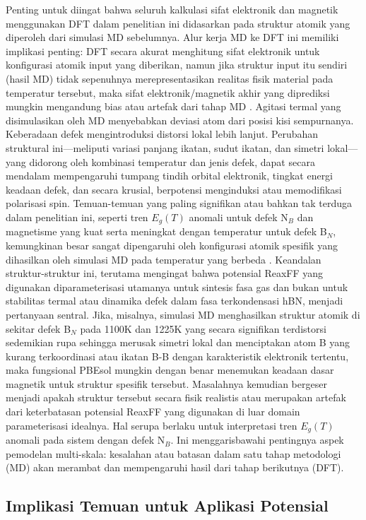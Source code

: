 Penting untuk diingat bahwa seluruh kalkulasi sifat elektronik dan magnetik menggunakan DFT dalam penelitian ini didasarkan pada struktur atomik yang diperoleh dari simulasi MD sebelumnya. Alur kerja MD ke DFT ini memiliki implikasi penting: DFT secara akurat menghitung sifat elektronik untuk konfigurasi atomik input yang diberikan, namun jika struktur input itu sendiri (hasil MD) tidak sepenuhnya merepresentasikan realitas fisik material pada temperatur tersebut, maka sifat elektronik/magnetik akhir yang diprediksi mungkin mengandung bias atau artefak dari tahap MD . Agitasi termal yang disimulasikan oleh MD menyebabkan deviasi atom dari posisi kisi sempurnanya. Keberadaan defek mengintroduksi distorsi lokal lebih lanjut. Perubahan struktural ini—meliputi variasi panjang ikatan, sudut ikatan, dan simetri lokal—yang didorong oleh kombinasi temperatur dan jenis defek, dapat secara mendalam mempengaruhi tumpang tindih orbital elektronik, tingkat energi keadaan defek, dan secara krusial, berpotensi menginduksi atau memodifikasi polarisasi spin. Temuan-temuan yang paling signifikan atau bahkan tak terduga dalam penelitian ini, seperti tren $E_g(T)$ anomali untuk defek N$_B$ dan magnetisme yang kuat serta meningkat dengan temperatur untuk defek B$_N$, kemungkinan besar sangat dipengaruhi oleh konfigurasi atomik spesifik yang dihasilkan oleh simulasi MD pada temperatur yang berbeda . Keandalan struktur-struktur ini, terutama mengingat bahwa potensial ReaxFF yang digunakan \citep{Lele2022} diparameterisasi utamanya untuk sintesis fasa gas dan bukan untuk stabilitas termal atau dinamika defek dalam fasa terkondensasi hBN, menjadi pertanyaan sentral. Jika, misalnya, simulasi MD menghasilkan struktur atomik di sekitar defek B$_N$ pada 1100K dan 1225K yang secara signifikan terdistorsi sedemikian rupa sehingga merusak simetri lokal dan menciptakan atom B yang kurang terkoordinasi atau ikatan B-B dengan karakteristik elektronik tertentu, maka fungsional PBEsol mungkin dengan benar menemukan keadaan dasar magnetik untuk struktur spesifik tersebut. Masalahnya kemudian bergeser menjadi apakah struktur tersebut secara fisik realistis atau merupakan artefak dari keterbatasan potensial ReaxFF yang digunakan di luar domain parameterisasi idealnya. Hal serupa berlaku untuk interpretasi tren $E_g(T)$ anomali pada sistem dengan defek N$_B$. Ini menggarisbawahi pentingnya aspek pemodelan multi-skala: kesalahan atau batasan dalam satu tahap metodologi (MD) akan merambat dan mempengaruhi hasil dari tahap berikutnya (DFT). \subsection{Implikasi Temuan untuk Aplikasi Potensial}
